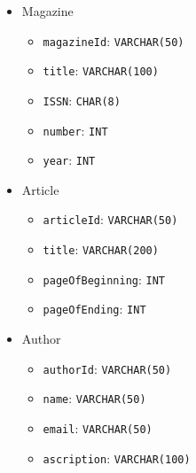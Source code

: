 \documentclass{assignment}
\begin{document}
\noindent
\begin{minipage}[t]{0.31\textwidth}
    \begin{itemize}[noitemsep]
        \item Magazine
            \begin{itemize}[noitemsep, leftmargin=1em]
                \item \texttt{magazineId}: {\small\texttt{VARCHAR(50)}}
                \item \texttt{title}: {\small\texttt{VARCHAR(100)}}
                \item \texttt{ISSN}: {\small\texttt{CHAR(8)}}
                \item \texttt{number}: {\small\texttt{INT}}
                \item \texttt{year}: {\small\texttt{INT}}
            \end{itemize}
    \end{itemize}
\end{minipage}
\hfill
\begin{minipage}[t]{0.31\textwidth}
    \begin{itemize}[noitemsep, leftmargin=1em]
        \item Article
            \begin{itemize}[noitemsep, leftmargin=1em]
                \item \texttt{articleId}: {\small\texttt{VARCHAR(50)}}
                \item \texttt{title}: {\small\texttt{VARCHAR(200)}}
                \item \texttt{pageOfBeginning}: {\small\texttt{INT}}
                \item \texttt{pageOfEnding}: {\small\texttt{INT}}
            \end{itemize}
    \end{itemize}
\end{minipage}
\hfill
\begin{minipage}[t]{0.31\textwidth}
    \begin{itemize}[noitemsep, leftmargin=1em]
        \item Author
            \begin{itemize}[noitemsep, leftmargin=1em]
                \item \texttt{authorId}: {\small\texttt{VARCHAR(50)}}
                \item \texttt{name}: {\small\texttt{VARCHAR(50)}}
                \item \texttt{email}: {\small\texttt{VARCHAR(50)}}
                \item \texttt{ascription}: {\small\texttt{VARCHAR(100)}}
            \end{itemize}
    \end{itemize}
\end{minipage}
\end{document}
